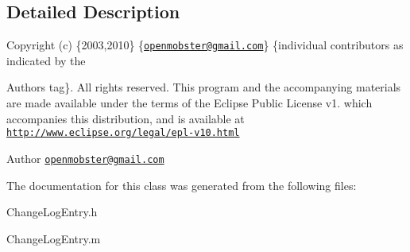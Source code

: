 \subsection{\-Detailed \-Description}
\-Copyright (c) \{2003,2010\} \{\href{mailto:openmobster@gmail.com}{\tt openmobster@gmail.\-com}\} \{individual contributors as indicated by the \begin{DoxyAuthor}{\-Authors}
tag\}. \-All rights reserved. \-This program and the accompanying materials are made available under the terms of the \-Eclipse \-Public \-License v1. which accompanies this distribution, and is available at \href{http://www.eclipse.org/legal/epl-v10.html}{\tt http\-://www.\-eclipse.\-org/legal/epl-\/v10.\-html}
\end{DoxyAuthor}
\begin{DoxyAuthor}{\-Author}
\href{mailto:openmobster@gmail.com}{\tt openmobster@gmail.\-com} 
\end{DoxyAuthor}


\-The documentation for this class was generated from the following files\-:\begin{DoxyCompactItemize}
\item 
\-Change\-Log\-Entry.\-h\item 
\-Change\-Log\-Entry.\-m\end{DoxyCompactItemize}
